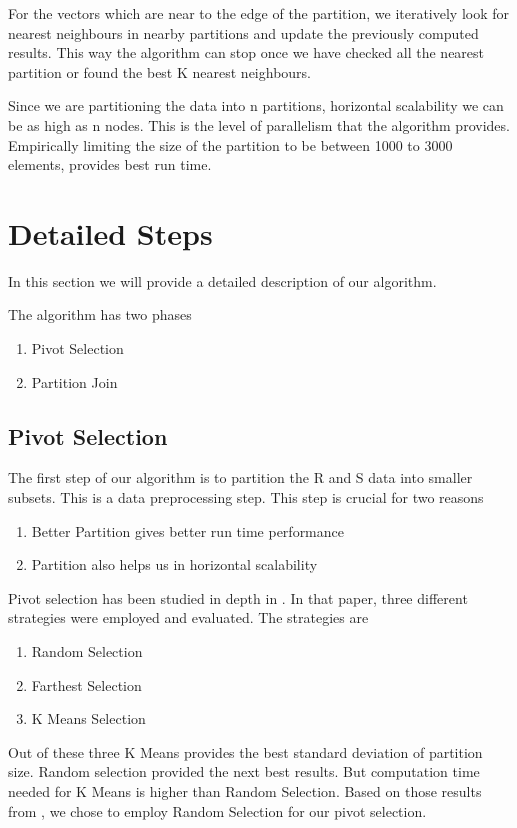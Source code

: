 For the vectors which are near to the edge of the partition, we
iteratively look for nearest neighbours in nearby partitions and
update the previously computed results. This way the algorithm can
stop once we have checked all the nearest partition or found the best
K nearest neighbours.

Since we are partitioning the data into n partitions, horizontal scalability we can
be as high as n nodes. This is the level of parallelism that
the algorithm provides. Empirically limiting the size of the
partition to be between 1000 to 3000 elements, provides best run time.

\section{Detailed Steps}

In this section we will provide a detailed description of our
algorithm.

The algorithm has two phases
\begin{enumerate}
\item Pivot Selection
\item Partition Join
\end{enumerate}

\subsection{Pivot Selection}
The first step of our algorithm is to partition the R and S data into smaller
subsets. This is a data preprocessing step. This step is crucial for
two reasons

\begin{enumerate}
\item Better Partition gives better run time performance
\item Partition also helps us in horizontal scalability
\end{enumerate}

Pivot selection has been studied in depth in \cite{lu_efficient_2012}.
In that paper, three different strategies were employed and
evaluated. The strategies are
\begin{enumerate}
\item Random Selection
\item Farthest Selection
\item K Means Selection
\end{enumerate}

Out of these three K Means provides the best standard deviation of
partition size. Random selection provided the next best results. But
computation time needed for K Means is higher than Random
Selection. Based on those results from \cite{lu_efficient_2012}, we
chose to employ Random Selection for our pivot selection.

